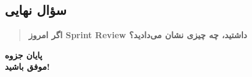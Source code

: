 \documentclass[12pt, a4paper]{article}
\begin{document}
\subsection{سؤال نهایی}

\begin{quote}
\textbf{اگر امروز Sprint Review داشتید، چه چیزی نشان می‌دادید؟}
\end{quote}

\vspace{1cm}

\begin{center}
\textbf{\Large پایان جزوه}\\[0.5cm]
\textbf{\Large موفق باشید!}
\end{center}
\end{document}
